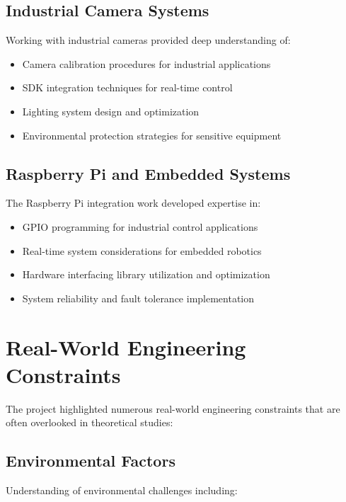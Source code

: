 \documentclass{book}
\begin{document}
\subsection{Industrial Camera Systems}
\par\noindent Working with industrial cameras provided deep understanding of:

\begin{itemize}
\item Camera calibration procedures for industrial applications
\item SDK integration techniques for real-time control
\item Lighting system design and optimization
\item Environmental protection strategies for sensitive equipment
\end{itemize}

\subsection{Raspberry Pi and Embedded Systems}
\par\noindent The Raspberry Pi integration work developed expertise in:

\begin{itemize}
\item GPIO programming for industrial control applications
\item Real-time system considerations for embedded robotics
\item Hardware interfacing library utilization and optimization
\item System reliability and fault tolerance implementation
\end{itemize}

\section{Real-World Engineering Constraints}

\par\noindent The project highlighted numerous real-world engineering constraints that are often overlooked in theoretical studies:

\subsection{Environmental Factors}
\par\noindent Understanding of environmental challenges including:
\end{document}
